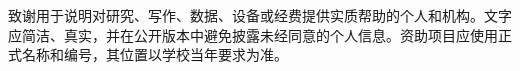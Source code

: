 \begin{acknowledgement}
致谢用于说明对研究、写作、数据、设备或经费提供实质帮助的个人和机构。文字应简洁、真实，并在公开版本中避免披露未经同意的个人信息。资助项目应使用正式名称和编号，其位置以学校当年要求为准。
\end{acknowledgement}
